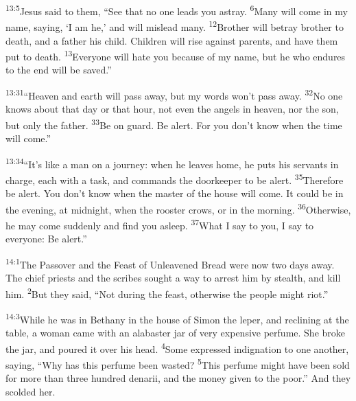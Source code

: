 \documentclass[openany,12pt,english]{book}
\newenvironment{para}{\par\pretolerance=100\tolerance=200\setlength{\emergencystretch}{0.6em}\relax}{\par}
\begin{document}
\begin{para}
    \textsuperscript{13:5}\thinspace{}Jesus said to them, “See that no one leads you a\-stray.
    \textsuperscript{6}\thinspace{}Man\-y will come in my name, say\-ing, ‘I am he,’ and will mis\-lead man\-y.
    \textsuperscript{12}\thinspace{}Broth\-er will be\-tray broth\-er to death, and a fa\-ther his child. Chil\-dren will rise a\-gainst parents, and have them put to death.
    \textsuperscript{13}\thinspace{}Eve\-ry\-one will hate you be\-cause of my name, but he who endures to the end will be saved.”
\end{para}

\begin{para}
    \textsuperscript{13:31}\thinspace{}“Heav\-en and earth will pass a\-way, but my words won't pass a\-way.
    \textsuperscript{32}\thinspace{}No one knows a\-bout that day or that hour, not e\-ven the angels in heav\-en, nor the son, but on\-ly the fa\-ther.
    \textsuperscript{33}\thinspace{}Be on guard. Be a\-lert. For you don't know when the time will come.”
\end{para}

\begin{para}
    \textsuperscript{13:34}\thinspace{}“It's like a man on a jour\-ney: when he leaves home, he puts his servants in charge, each with a task, and commands the door\-keep\-er to be a\-lert.
    \textsuperscript{35}\thinspace{}There\-fore be a\-lert. You don't know when the mas\-ter of the house will come. It could be in the eve\-ning, at mid\-night, when the roost\-er crows, or in the morn\-ing.
    \textsuperscript{36}\thinspace{}Oth\-er\-wise, he may come sud\-den\-ly and find you a\-sleep.
    \textsuperscript{37}\thinspace{}What I say to you, I say to eve\-ry\-one: Be a\-lert.”
\end{para}

\bigskip{}

\begin{para}
    \textsuperscript{14:1}\thinspace{}The Passover and the Feast of Un\-leav\-ened Bread were now two days a\-way. The chief priests and the scribes sought a way to ar\-rest him by stealth, and kill him.
    \textsuperscript{2}\thinspace{}But they said, “Not dur\-ing the feast, oth\-er\-wise the peo\-ple might ri\-ot.”
\end{para}

\begin{para}
    \textsuperscript{14:3}\thinspace{}While he was in Bethany in the house of Simon the lep\-er, and re\-clin\-ing at the ta\-ble, a wom\-an came with an al\-a\-bas\-ter jar of ver\-y ex\-pen\-sive per\-fume. She broke the jar, and poured it over his head.
    \textsuperscript{4}\thinspace{}Some expressed in\-dig\-na\-tion to one an\-oth\-er, say\-ing, “Why has this per\-fume been wast\-ed?
    \textsuperscript{5}\thinspace{}This per\-fume might have been sold for more than three hun\-dred de\-nar\-i\-i, and the mon\-ey giv\-en to the poor.” And they scolded her.
\end{para}
\end{document}
